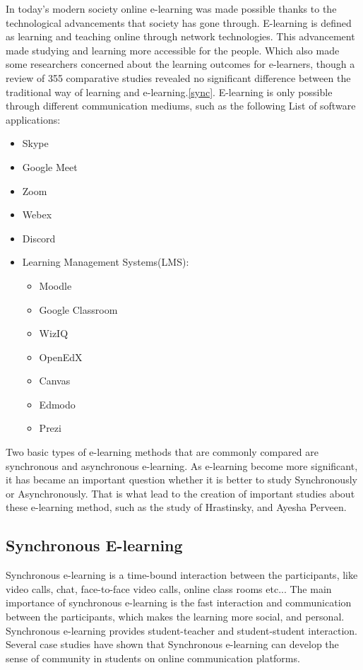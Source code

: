 \documentclass[10pt,twoside,english,a4paper]{article}
\begin{document}
In today's modern society online e-learning was made possible thanks to the technological advancements that society has gone through. E-learning is defined as learning and teaching online through network technologies. This advancement made studying and learning more accessible for the people. Which also made some researchers concerned about the learning outcomes for e-learners, though a review of 355 comparative studies revealed no significant difference between the traditional way of learning and e-learning.\ref{sync}.
E-learning is only possible through different communication mediums, such as the following
List of software applications:
\begin{itemize}
\item Skype
\item Google Meet
\item Zoom
\item Webex
\item Discord 
\item Learning Management Systems(LMS):
	\begin{itemize}
	\item Moodle
	\item Google Classroom
	\item WizIQ
	\item OpenEdX
	\item Canvas
	\item Edmodo
	\item Prezi
	\end{itemize}
\end{itemize}
Two basic types of e-learning methods that are commonly compared are synchronous and asynchronous e-learning.
As e-learning become more significant, it has became an important question whether it is better to study  Synchronously or Asynchronously.
That is what lead to the creation of important studies about these e-learning method, such as the study of Hrastinsky, and Ayesha Perveen.

\subsection{Synchronous E-learning} \label{async}

Synchronous e-learning is a time-bound interaction between the participants, like video calls, chat, face-to-face video calls, online class rooms etc...
The main importance of synchronous e-learning is the fast interaction and communication between the participants, which makes the learning more social, and personal. Synchronous e-learning provides student-teacher and student-student interaction.
Several case studies have shown that Synchronous e-learning can develop the sense of community in students on online communication platforms.
\end{document}
